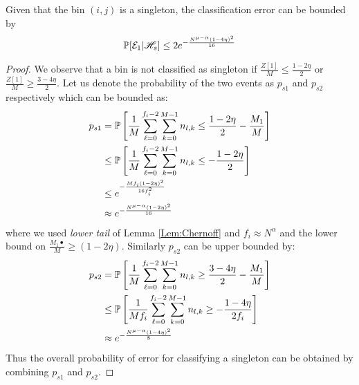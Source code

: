 \begin{lemma}[singleton]
\label{Lem:SingletonClassif}
Given that the bin $(i,j)$ is a singleton, the classification error can be bounded by
\begin{align*}
\mathbb{P}[\mathcal{E}_1|\mathscr{H}_s]\leq 2e^{-\frac{N^{\mu-\alpha}(1-4\eta)^2}{16}}
\end{align*}
\end{lemma}
\begin{proof}
We observe that a bin is not classified as singleton if $\frac{Z[1]}{M}\leq\frac{1-2\eta}{2}$ or $\frac{Z[1]}{M}\geq\frac{3-4\eta}{2}$. Let us denote the probability of the two events as $p_{s1}$ and $p_{s2}$ respectively which can be bounded as:
\begin{align*}
p_{s1}&=\mathbb{P}\left[\frac{1}{M}\sum\limits_{\ell=0}^{f_{i}-2}\sum\limits_{k=0}^{M-1} n_{l,k}\leq\frac{1-2\eta}{2}-\frac{M_1}{M}\right]\\
&\leq \mathbb{P}\left[\frac{1}{M}\sum\limits_{\ell=0}^{f_{i}-2}\sum\limits_{k=0}^{M-1} n_{l,k}\leq-\frac{1-2\eta}{2}\right]\\
&\leq e^{-\frac{Mf_i(1-2\eta)^2}{16f_i^{2}}}\\
&\approx e^{-\frac{N^{\mu-\alpha}(1-2\eta)^2}{16}}
\end{align*} 
where we used  {\it lower tail} of Lemma \ref{Lem:Chernoff} and $f_i\approx N^{\alpha}$ and the lower bound on $\frac{M_1•}{M}\geq (1-2\eta)$. Similarly $p_{s2}$ can be upper bounded by:
\begin{align*}
p_{s2}&=\mathbb{P}\left[\frac{1}{M}\sum\limits_{\ell=0}^{f_{i}-2}\sum\limits_{k=0}^{M-1} n_{l,k}\geq\frac{3-4\eta}{2}-\frac{M_1}{M}\right]\\
&\leq \mathbb{P}\left[\frac{1}{Mf_i}\sum\limits_{\ell=0}^{f_{i}-2}\sum\limits_{k=0}^{M-1} n_{l,k}\geq-\frac{1-4\eta}{2f_i}\right]\\
&\approx e^{-\frac{N^{\mu-\alpha}(1-4\eta)^2}{8}}
\end{align*} 
Thus the overall probability of error for classifying a singleton can be obtained by combining $p_{s1}$ and $p_{s2}$.
\end{proof}


